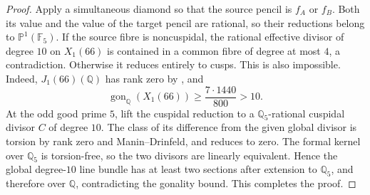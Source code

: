 \begin{proof}
Apply a simultaneous diamond so that the source pencil is $f_A$ or
$f_B$. Both its value and the value of the target pencil are rational,
so their reductions belong to $\mathbb P^1(\mathbb F_5)$.
If the source fibre is noncuspidal, the rational effective divisor of
degree $10$ on $X_1(66)$ is contained in a common fibre of degree at
most $4$, a contradiction. Otherwise it reduces entirely to cusps.
This is also impossible. Indeed, $J_1(66)(\mathbb Q)$ has rank zero
by \cite[Theorem~3.1(2)]{DEHMZ}, and
\[
 \operatorname{gon}_{\mathbb Q}(X_1(66))
 \geq \frac{7\cdot1440}{800}>10.
\]
At the odd good prime $5$, lift the cuspidal reduction to a
$\mathbb Q_5$-rational cuspidal divisor $C$ of degree $10$.
The class of its difference from the given global divisor is torsion
by rank zero and Manin--Drinfeld, and reduces to zero. The formal
kernel over $\mathbb Q_5$ is torsion-free, so the two divisors are
linearly equivalent. Hence the global degree-$10$ line bundle has at
least two sections after extension to $\mathbb Q_5$, and therefore
over $\mathbb Q$, contradicting the gonality bound. This completes
the proof.
\end{proof}
